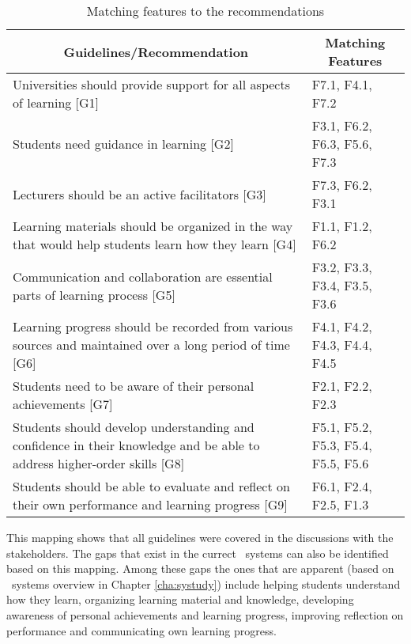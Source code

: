 \begin{table}[hb] \small
\centering
    \setlength{\abovecaptionskip}{0pt}
	\caption{Matching features to the recommendations}
    \begin{tabular}{|p{9.8cm}|p{2.6cm}|}
     \hline
     \multicolumn{1}{|c|}{\textbf{Guidelines/Recommendation}} &
     \multicolumn{1}{c|}{\textbf{Matching Features}} \\
     \hline
    Universities should provide support for all aspects of learning [G1] & F7.1,
    F4.1, F7.2 \\ \hline 
    Students need guidance in learning [G2] & F3.1, F6.2, F6.3, F5.6, F7.3
    \\ \hline
    Lecturers should be an active facilitators [G3] & F7.3, F6.2, F3.1 \\ \hline
    Learning materials should be organized in the way that would help students
	learn how they learn [G4] & F1.1, F1.2, F6.2 \\ \hline 
    Communication and collaboration are essential parts of learning process [G5]
    & F3.2, F3.3, F3.4, F3.5, F3.6 \\ \hline 
	Learning progress should be recorded from various sources and maintained
    over a long period of time [G6] & F4.1, F4.2, F4.3, F4.4, F4.5 \\ \hline 
    Students need to be aware of their personal achievements [G7] & F2.1, F2.2,
    F2.3 \\ \hline 
	Students should develop understanding and confidence in their knowledge and
	be able to address higher-order skills [G8] & F5.1, F5.2, F5.3, F5.4, F5.5,
	F5.6 \\	\hline 
	Students should be able to evaluate and reflect on their own performance and
	learning progress [G9] & F6.1, F2.4, F2.5, F1.3 \\ \hline 
    \end{tabular}
    \label{tab:mapping}
\end{table}

This mapping shows that all guidelines were covered in the discussions with the
stakeholders. The gaps that exist in the currect \ep~systems can also be
identified based on this mapping. Among these gaps the ones that are apparent
(based on \ep~systems overview in Chapter \ref{cha:systudy}) include helping
students understand how they learn, organizing learning material and knowledge,
developing awareness of personal achievements and learning progress, improving
reflection on performance and communicating own learning progress.

